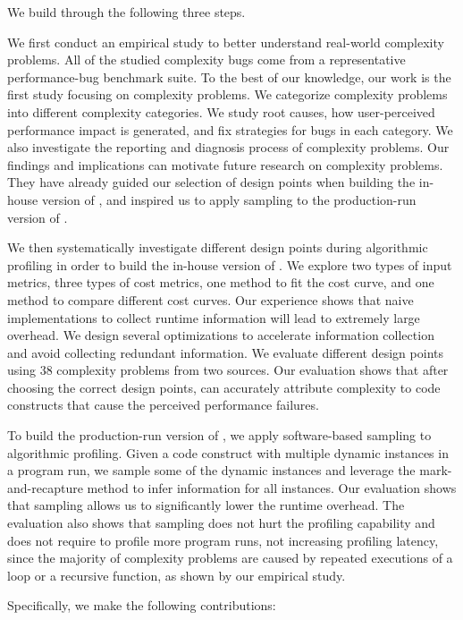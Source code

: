 We build \Tool through the following three steps.

We first conduct an empirical study to better understand
real-world complexity problems.
All of the studied complexity bugs come from a representative
performance-bug benchmark suite\cite{PerfBug,SongOOPSLA2014}.
To the best of our knowledge, our work is the first study focusing on complexity problems.
We categorize complexity problems into different complexity categories.
We study root causes,
how user-perceived performance impact is generated,
and fix strategies for bugs in each category.
We also investigate the reporting and diagnosis process of complexity problems.
Our findings and implications can motivate future research on complexity problems.
They have already guided our selection of design points when building the in-house version of \Tool,
and inspired us to apply sampling to the production-run version of \Tool.

We then systematically investigate different design points during algorithmic profiling
in order to build the in-house version of \Tool.
We explore two types of input metrics,
three types of cost metrics,
one method to fit the cost curve,
and one method to compare different cost curves.
Our experience shows that naive implementations
to collect runtime information
will lead to extremely large overhead.
We design several optimizations to accelerate information collection
and avoid collecting redundant information.
We evaluate different design points
using $38$ complexity problems from two sources.
Our evaluation shows that after choosing the correct design points,
\Tool can accurately attribute complexity to code constructs
that cause the perceived performance failures.

To build the production-run version of \Tool,
we apply software-based sampling to algorithmic profiling.
Given a code construct with multiple dynamic instances in a program run,
we sample some of the dynamic instances and leverage the mark-and-recapture
method\citep{mark-recapture} to infer information for all instances.
Our evaluation shows that
sampling allows us to significantly lower the runtime overhead.
The evaluation also shows that sampling does not hurt the profiling capability
and does not require to profile more program runs,
not increasing profiling latency, since
the majority of complexity problems are caused by
repeated executions of a loop or a recursive function, as shown by our empirical study.



Specifically, we make the following contributions:

